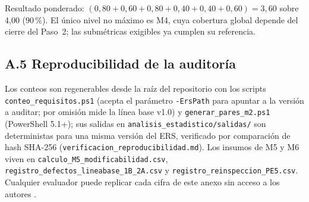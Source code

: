 \noindent Resultado ponderado: $(0{,}80+0{,}60+0{,}80+0{,}40+0{,}40+0{,}60) = 3{,}60$ sobre 4,00 ($90\,\%$). El \'unico nivel no m\'aximo es M4, cuya cobertura global depende del cierre del Paso~2; las subm\'etricas exigibles ya cumplen su referencia.

\subsection*{A.5 Reproducibilidad de la auditor\'ia}

Los conteos son regenerables desde la ra\'iz del repositorio con los scripts \texttt{conteo\_requisitos.ps1} (acepta el par\'ametro \texttt{-ErsPath} para apuntar a la versi\'on a auditar; por omisi\'on mide la l\'inea base v1.0) y \texttt{generar\_pares\_m2.ps1} (PowerShell 5.1+); sus salidas en \texttt{analisis\_estadistico/salidas/} son deterministas para una misma versi\'on del ERS, verificado por comparaci\'on de hash SHA-256 (\texttt{verificacion\_reproducibilidad.md}). Los insumos de M5 y M6 viven en \texttt{calculo\_M5\_modificabilidad.csv}, \texttt{registro\_defectos\_lineabase\_1B\_2A.csv} y \texttt{registro\_reinspeccion\_PE5.csv}. Cualquier evaluador puede replicar cada cifra de este anexo sin acceso a los autores \cite{wohlin2012}.
